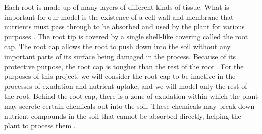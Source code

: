 \documentclass[11pt]{article}
\numberwithin{equation}{section}
\begin{document}
Each root is made up of many layers of different kinds of tissue. What is important for our model is the existence of a cell wall and membrane that nutrients must pass through to be absorbed and used by the plant for various purposes \cite{PALLARDY2008255}. The root tip is covered by a single shell-like covering called the root cap. The root cap allows the root to push down into the soil without any important parts of its surface being damaged in the process. Because of its protective purpose, the root cap is tougher than the rest of the root \cite{haberlandt1914}. For the purposes of this project, we will consider the root cap to be inactive in the processes of exudation and nutrient uptake, and we will model only the rest of the root.
Behind the root cap, there is a zone of exudation within which the plant may secrete certain chemicals out into the soil. These chemicals may break down nutrient compounds in the soil that cannot be absorbed directly, helping the plant to process them \cite{10.3389/fpls.2019.00157}.
\end{document}
